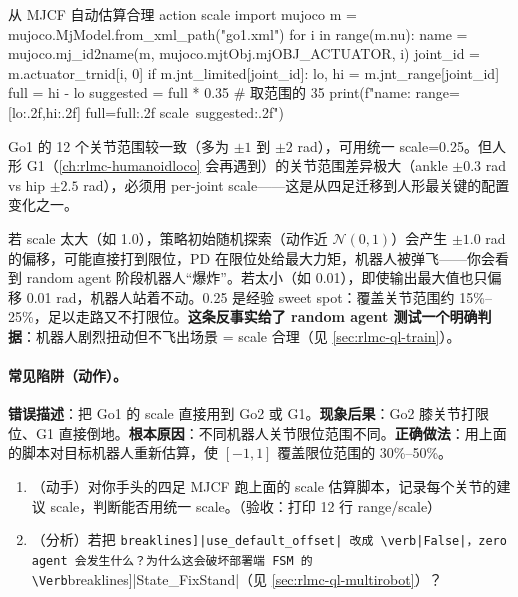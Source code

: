 \begin{codebox}[Python]{从 MJCF 自动估算合理 action scale}
import mujoco
m = mujoco.MjModel.from_xml_path("go1.xml")
for i in range(m.nu):
    name = mujoco.mj_id2name(m, mujoco.mjtObj.mjOBJ_ACTUATOR, i)
    joint_id = m.actuator_trnid[i, 0]
    if m.jnt_limited[joint_id]:
        lo, hi = m.jnt_range[joint_id]
        full = hi - lo
        suggested = full * 0.35              # 取范围的 35%
        print(f"{name}: range=[{lo:.2f},{hi:.2f}] full={full:.2f} scale~{suggested:.2f}")
\end{codebox}

Go1 的 12 个关节范围较一致（多为 $\pm 1$ 到 $\pm 2$ rad），可用统一 scale=0.25。但人形 G1（\cref{ch:rlmc-humanoidloco} 会再遇到）的关节范围差异极大（ankle $\pm 0.3$ rad vs hip $\pm 2.5$ rad），必须用 per-joint scale——这是从四足迁移到人形最关键的配置变化之一。

\begin{insight}\label{ins:rlmc-ql-scale}
若 scale 太大（如 1.0），策略初始随机探索（动作近 $\mathcal{N}(0,1)$）会产生 $\pm 1.0$ rad 的偏移，可能直接打到限位，PD 在限位处给最大力矩，机器人被弹飞——你会看到 random agent 阶段机器人“爆炸”。若太小（如 0.01），即使输出最大值也只偏移 0.01 rad，机器人站着不动。0.25 是经验 sweet spot：覆盖关节范围约 15\%--25\%，足以走路又不打限位。\textbf{这条反事实给了 random agent 测试一个明确判据}：机器人剧烈扭动但不飞出场景 = scale 合理（见 \cref{sec:rlmc-ql-train}）。
\end{insight}

\paragraph{常见陷阱（动作）。}

\begin{pitfall}
\textbf{错误描述}：把 Go1 的 scale 直接用到 Go2 或 G1。\textbf{现象后果}：Go2 膝关节打限位、G1 直接倒地。\textbf{根本原因}：不同机器人关节限位范围不同。\textbf{正确做法}：用上面的脚本对目标机器人重新估算，使 $[-1,1]$ 覆盖限位范围的 30\%--50\%。
\end{pitfall}

\begin{practice}[动作链路]
\begin{enumerate}
\item （动手）对你手头的四足 MJCF 跑上面的 scale 估算脚本，记录每个关节的建议 scale，判断能否用统一 scale。（验收：打印 12 行 range/scale）
\item （分析）若把 \Verb[breaklines]|use_default_offset| 改成 \verb|False|，zero agent 会发生什么？为什么这会破坏部署端 FSM 的 \Verb[breaklines]|State_FixStand|（见 \cref{sec:rlmc-ql-multirobot}）？
\end{enumerate}
\end{practice}

